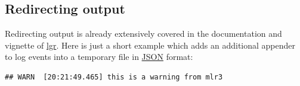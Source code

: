 \documentclass[]{scrbook}
\newenvironment{Shaded}{\begin{snugshade}}{\end{snugshade}}
\newcommand{\CommentTok}[1]{\textcolor[rgb]{0.56,0.35,0.01}{\textit{#1}}}
\newcommand{\DataTypeTok}[1]{\textcolor[rgb]{0.13,0.29,0.53}{#1}}
\newcommand{\KeywordTok}[1]{\textcolor[rgb]{0.13,0.29,0.53}{\textbf{#1}}}
\newcommand{\NormalTok}[1]{#1}
\newcommand{\OperatorTok}[1]{\textcolor[rgb]{0.81,0.36,0.00}{\textbf{#1}}}
\newcommand{\StringTok}[1]{\textcolor[rgb]{0.31,0.60,0.02}{#1}}
\renewenvironment{Shaded} {\begin{snugshade}\small} {\end{snugshade}}
\begin{document}
\begin{Shaded}
\end{Shaded}

\hypertarget{redirecting-output}{%
\subsection{Redirecting output}\label{redirecting-output}}

Redirecting output is already extensively covered in the documentation and vignette of \href{https://cran.r-project.org/package=lgr}{lgr}.
Here is just a short example which adds an additional appender to log events into a temporary file in \href{https://en.wikipedia.org/wiki/JSON}{JSON} format:

\begin{Shaded}
\end{Shaded}

\begin{verbatim}
## WARN  [20:21:49.465] this is a warning from mlr3
\end{verbatim}
\end{document}
